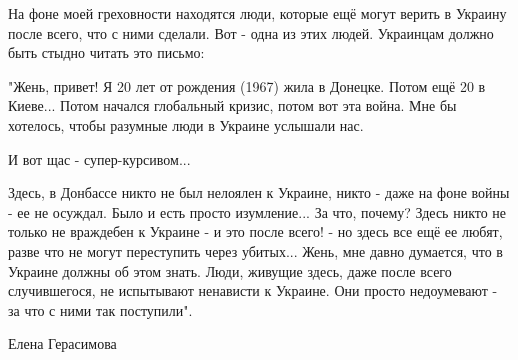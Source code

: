 На фоне моей греховности находятся люди, которые ещё могут верить в Украину
после всего, что с ними сделали. Вот - одна из этих людей. Украинцам должно
быть стыдно читать это письмо:

"Жень, привет! Я 20 лет от рождения (1967) жила в Донецке. Потом ещё 20 в
Киеве... Потом начался глобальный кризис, потом вот эта война. Мне бы хотелось,
чтобы разумные люди в Украине услышали нас.

И вот щас - супер-курсивом...

Здесь, в Донбассе никто не был нелоялен к Украине, никто - даже на фоне войны -
ее не осуждал. Было и есть просто изумление... За что, почему? Здесь никто не
только не враждебен к Украине - и это после всего! - но здесь все ещё ее любят,
разве что не могут переступить через убитых... Жень, мне давно думается, что в
Украине должны об этом знать. Люди, живущие здесь, даже после всего
случившегося, не испытывают ненависти к Украине. Они просто недоумевают - за
что с ними так поступили".

Елена Герасимова
